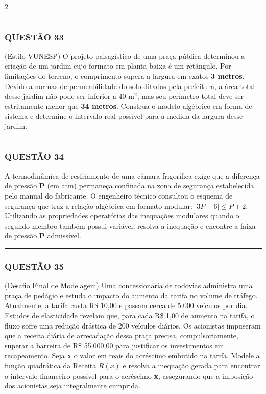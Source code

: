 \documentclass[twoside, 10pt, a4paper]{article}
\begin{document}
\begin{multicols*}{2}
\vspace{0cm} \noindent\textcolor{CorLinha}{\rule{\linewidth}{0.5pt}} \vspace{-0.2cm}
\subsubsection*{QUESTÃO 33}
(Estilo VUNESP) O projeto paisagístico de uma praça pública determinou a criação de um jardim cujo formato em planta baixa é um retângulo. Por limitações do terreno, o comprimento supera a largura em exatos \textbf{3 metros}. Devido a normas de permeabilidade do solo ditadas pela prefeitura, a área total desse jardim não pode ser inferior a $ 40 \text{ m}^2 $, mas seu perímetro total deve ser estritamente menor que \textbf{34 metros}. Construa o modelo algébrico em forma de sistema e determine o intervalo real possível para a medida da largura desse jardim.

\vspace{0cm} \noindent\textcolor{CorLinha}{\rule{\linewidth}{0.5pt}} \vspace{-0.2cm}
\subsubsection*{QUESTÃO 34}
A termodinâmica de resfriamento de uma câmara frigorífica exige que a diferença de pressão \textbf{P} (em atm) permaneça confinada na zona de segurança estabelecida pelo manual do fabricante. O engenheiro técnico consultou o esquema de segurança que traz a relação algébrica em formato modular: $ |3P - 6| \le P + 2 $. Utilizando as propriedades operatórias das inequações modulares quando o segundo membro também possui variável, resolva a inequação e encontre a faixa de pressão \textbf{P} admissível.

\vspace{0cm} \noindent\textcolor{CorLinha}{\rule{\linewidth}{0.5pt}} \vspace{-0.2cm}
\subsubsection*{QUESTÃO 35}
(Desafio Final de Modelagem) Uma concessionária de rodovias administra uma praça de pedágio e estuda o impacto do aumento da tarifa no volume de tráfego. Atualmente, a tarifa custa R\$ 10,00 e passam cerca de 5.000 veículos por dia. Estudos de elasticidade revelam que, para cada R\$ 1,00 de aumento na tarifa, o fluxo sofre uma redução drástica de 200 veículos diários. Os acionistas impuseram que a receita diária de arrecadação dessa praça precisa, compulsoriamente, superar a barreira de R\$ 55.000,00 para justificar os investimentos em recapeamento. 
Seja \textbf{x} o valor em reais do acréscimo embutido na tarifa. Modele a função quadrática da Receita $ R(x) $ e resolva a inequação gerada para encontrar o intervalo financeiro possível para o acréscimo \textbf{x}, assegurando que a imposição dos acionistas seja integralmente cumprida.

\end{multicols*}
\end{document}
